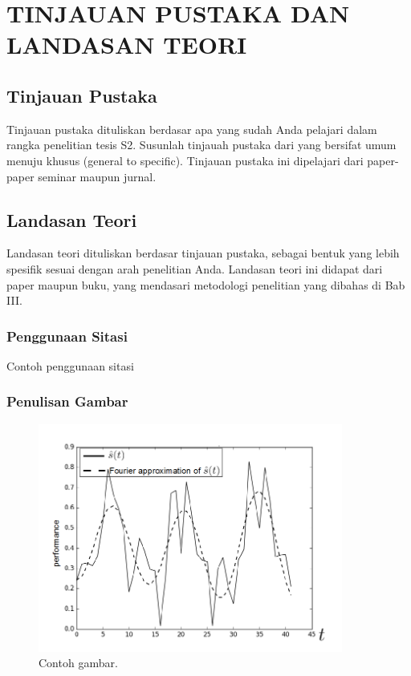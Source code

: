 \chapter{TINJAUAN PUSTAKA DAN LANDASAN TEORI}


\section{Tinjauan Pustaka}
	Tinjauan pustaka dituliskan berdasar apa yang sudah Anda pelajari dalam rangka penelitian tesis S2. Susunlah tinjauah pustaka dari yang bersifat umum menuju khusus (general to specific). Tinjauan pustaka ini dipelajari dari paper-paper seminar maupun jurnal.
	
\section{Landasan Teori}
	Landasan teori dituliskan berdasar tinjauan pustaka, sebagai bentuk yang lebih spesifik sesuai dengan arah penelitian Anda. Landasan teori ini didapat dari paper maupun buku, yang mendasari metodologi penelitian yang dibahas di Bab III.


\subsection{Penggunaan Sitasi}
Contoh penggunaan sitasi \cite{lukito2016,santosa2011user}
\cite{setiawan2014fuzzy} \cite{wibowo2014line} \cite{marenda2016digitory} \cite{wibirama2013dual,wibowo2016clustering}

\subsection{Penulisan Gambar}

\begin{figure}[h]
	\centering
	\includegraphics[width=10cm]{contents/chapter-2/sample-fig.png}
	\caption{Contoh gambar.}
	\label{Fig: Contoh gambar}
\end{figure}


